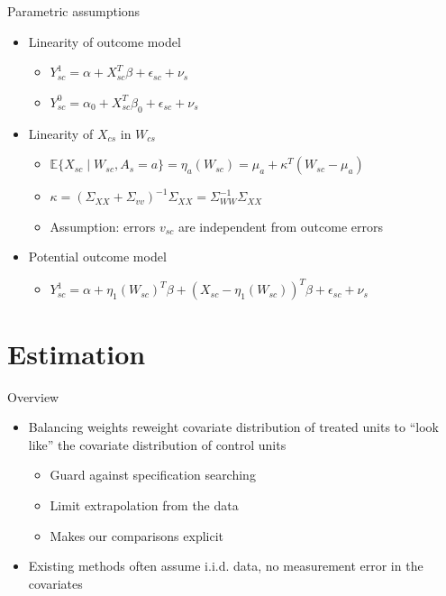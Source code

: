 \documentclass[hyperref={pdfpagelabels=false}]{beamer}
\begin{document}
\begin{frame}{Parametric assumptions}
    \begin{itemize}
        \item Linearity of outcome model \bigskip
        \begin{itemize}
            \item $Y_{sc}^1 = \alpha + X_{sc}^T\beta + \epsilon_{sc} + \nu_s$ \bigskip
            \item $Y_{sc}^0 = \alpha_0 + X_{sc}^T\beta_0 + \epsilon_{sc} + \nu_s$ \bigskip
        \end{itemize}
        \item Linearity of $X_{cs}$ in $W_{cs}$ \bigskip 
        \begin{itemize}
            \item $\mathbb{E}\{X_{sc} \mid W_{sc}, A_s = a\} = \eta_a(W_{sc}) = \mu_a + \kappa^T(W_{sc} - \mu_a)$ \bigskip
            \item $\kappa = (\Sigma_{XX} + \Sigma_{vv})^{-1}\Sigma_{XX} = \Sigma_{WW}^{-1}\Sigma_{XX}$ \bigskip
            \item Assumption: errors $v_{sc}$ are independent from outcome errors \bigskip
        \end{itemize}
        \item Potential outcome model \bigskip
        \begin{itemize}
            \item $Y_{sc}^1 = \alpha + \eta_1(W_{sc})^T\beta + (X_{sc} - \eta_1(W_{sc}))^T\beta + \epsilon_{sc} + \nu_{s}$
        \end{itemize}
    \end{itemize}
\end{frame}

\section{Estimation}

\begin{frame}{Overview}
    \begin{itemize}
        \item Balancing weights reweight covariate distribution of treated units to ``look like'' the covariate distribution of control units \bigskip
        \begin{itemize}
            \item Guard against specification searching \bigskip
            \item Limit extrapolation from the data \bigskip
            \item Makes our comparisons explicit \bigskip
        \end{itemize}
        \item Existing methods often assume i.i.d. data, no measurement error in the covariates
    \end{itemize}
\end{frame}
\end{document}
